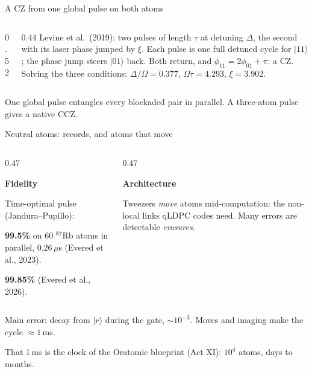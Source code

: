 \documentclass[aspectratio=169,11pt]{beamer}
\newcommand{\ket}[1]{|#1\rangle}
\newcommand{\blocktitle}[1]{{\bfseries #1}\par\vskip1mm}
\begin{document}
\begin{frame}{A CZ from one global pulse on both atoms}
\begin{columns}[c]
\begin{column}{0.52\textwidth}
    \end{column}
    \begin{column}{0.44\textwidth}
      Levine et al.\ (2019): two pulses of length $\tau$ at detuning $\Delta$, the second with its laser phase jumped by $\xi$.
      \vskip1mm
      Each pulse is one full detuned cycle for $\ket{11}$; the phase jump steers $\ket{01}$ back. Both return, and $\phi_{11}=2\phi_{01}+\pi$: a CZ.
      \vskip1mm
      Solving the three conditions: $\Delta/\Omega=0.377$, $\Omega\tau=4.293$, $\xi=3.902$.
    \end{column}
  \end{columns}
  \begin{takeaway}One global pulse entangles every blockaded pair in parallel. A three-atom pulse gives a native CCZ.\end{takeaway}
\end{frame}

\begin{frame}{Neutral atoms: records, and atoms that move}
  \begin{columns}[T]
    \begin{column}{0.47\textwidth}
      \begin{greyblock}
        \blocktitle{Fidelity}
        Time-optimal pulse (Jandura--Pupillo):\par
        \textbf{99.5\%} on 60 $^{87}$Rb atoms in parallel, 0.26\,$\mu$s (Evered et al., 2023).\par
        \textbf{99.85\%} (Evered et al., 2026).
      \end{greyblock}
    \end{column}
    \begin{column}{0.47\textwidth}
      \begin{greyblock}
        \blocktitle{Architecture}
        Tweezers \emph{move} atoms mid-computation: the non-local links qLDPC codes need. Many errors are detectable \emph{erasures}.
      \end{greyblock}
    \end{column}
  \end{columns}
  \vskip2mm
  Main error: decay from $\ket r$ during the gate, $\sim10^{-3}$. Moves and imaging make the cycle $\approx1$\,ms.
  \begin{takeaway}That 1\,ms is the clock of the Oratomic blueprint (Act XI): $10^4$ atoms, days to months.\end{takeaway}
\end{frame}
\end{document}
